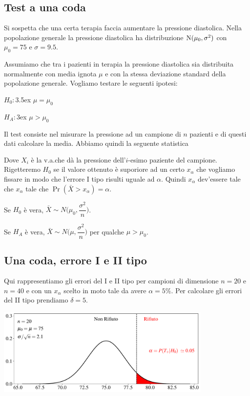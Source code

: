 \documentclass[11pt,openany]{book}
\begin{document}
\subsection{Test a una coda}
Si sospetta che una certa terapia faccia aumentare la pressione diastolica. Nella popolazione generale la pressione diastolica ha distribuzione ${\rm N}(\mu_0,\sigma^2)$ con $\mu_0=75$ e $\sigma=9.5$. 

Assumiamo che tra i pazienti in terapia la pressione diastolica sia distribuita normalmente con media ignota $\mu$ e con la stessa deviazione standard della popolazione generale. Vogliamo testare le seguenti ipotesi:

$H_0:$\kern3.5ex $\mu=\mu_0$

$H_A:$\kern3ex $\mu>\mu_0$

Il test consiste nel misurare la pressione ad un campione di $n$ pazienti e di questi dati calcolare la media. Abbiamo quindi la seguente statistica


Dove $X_i$ è la v.a.\@ che dà la pressione dell'$i$-esimo paziente del campione. Rigetteremo $H_0$ se il
valore ottenuto è suporiore ad un certo $x_\alpha$ che vogliamo fissare in modo che l'errore I tipo risulti uguale ad $\alpha$. Quindi $x_\alpha$ dev'essere tale che $x_\alpha$ tale che $\Pr(\bar X>x_\alpha)=\alpha$.

Se $H_0$ è vera, $\bar X\sim N\bigg(\mu_0,\dfrac{\sigma^2}{n}\bigg)$.

Se $H_A$ è vera, $\bar X\sim N\bigg(\mu,\dfrac{\sigma^2}{n}\bigg)$ per qualche $\mu>\mu_0$.

% 



\clearpage\subsection{Una coda, errore I e II tipo}


Qui rappresentiamo gli errori del I e II tipo per campioni di dimensione $n=20$ e $n= 40$ e con un $x_\alpha$ scelto in moto tale da avere $\alpha=5\%$. Per calcolare gli errori del II tipo prendiamo $\delta=5$.

\hfil\includegraphics[width=0.8\textwidth]{figure/Z-test_01.pdf}
\end{document}
